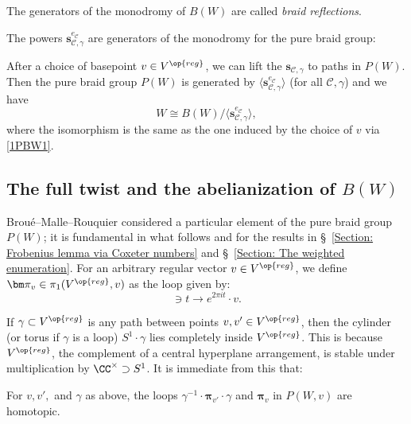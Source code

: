\begin{defi}
The generators of the monodromy of $B(W)$ are called {\it\color{blue} braid reflections}.
\end{defi}

\noindent The powers $\bm s_{\mathcal{C},\gamma}^{e_{\mathcal{C}}}$ are generators of the monodromy for the pure braid group: 

\begin{prop}\label{Prop: (braid reflections)^e_c generate P(W)}
After a choice of basepoint $v\in V^{\op{reg}}$, we can lift the $\bm s_{\mathcal{C},\gamma}$ to paths in $P(W)$. Then the pure braid group $P(W)$ is generated by $\langle \bm s_{\mathcal{C},\gamma}^{e_{\mathcal{C}}}\rangle$ (for all $\mathcal{C},\gamma$) and we have $$W\cong B(W)/\langle \bm s_{\mathcal{C},\gamma}^{e_{\mathcal{C}}}\rangle,$$ where the isomorphism is the same as the one induced by the choice of $v$ via \eqref{1PBW1}.
\end{prop} 



\subsection{The full twist and the abelianization of $B(W)$}


Brou{\'e}--Malle--Rouquier considered \cite[Notation~2.3]{broue-malle-rouquier-braid-hecke} a particular element of the pure braid group $P(W)$; it is fundamental in what follows and for the results in \S~\ref{Section: Frobenius lemma via Coxeter numbers} and \S~\ref{Section: The weighted enumeration}. For an arbitrary regular vector $v\in V^{\op{reg}}$, we define $\bm \pi_v\in\pi_1(V^{\op{reg}},v)$ as the loop given by: \begin{equation}[0,1]\ni t\rightarrow e^{2\pi i t}\cdot v.\label{EQ: full twist definition} \end{equation}

If $\gamma\subset V^{\op{reg}}$ is any path between points $v, v' \in V^{\op{reg}}$, then the cylinder (or torus if $\gamma$ is a loop) $S^1\cdot \gamma$ lies completely inside $V^{\op{reg}}$. This is because $V^{\op{reg}}$, the complement of a central hyperplane arrangement, is stable under multiplication by $\CC^{\times}\supset S^1$. It is immediate from this that:

\begin{lemma}\label{Lemma: full twist is central in fund. groupoid of V^reg}
For $v,v',$ and $\gamma$ as above, the loops $\gamma^{-1}\cdot\bm\pi_{v'}\cdot\gamma$ and $\bm\pi_v$ in $P(W,v)$ are homotopic. 
\end{lemma}

